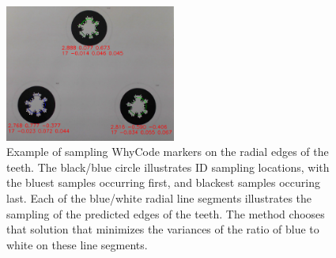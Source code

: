 \begin{figure}
    \centering
    \includegraphics[width=0.5\textwidth]{images/cropped_whycode_3_8_ellipse_sampling_example}
    \caption{Example of sampling WhyCode markers on the radial edges of the teeth.
    The black/blue circle illustrates ID sampling locations, with the bluest samples occurring first, and blackest samples occuring last.
    Each of the blue/white radial line segments illustrates the sampling of the predicted edges of the teeth.
    The method chooses that solution that minimizes the variances of the ratio of blue to white on these line segments.
    }
    \label{figure:ellipse_sampling}
\end{figure}

